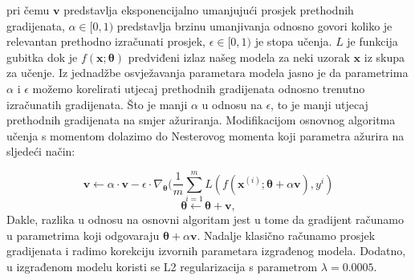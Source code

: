 \documentclass[times, utf8, diplomski]{fer}
\theoremstyle{definition}
\begin{document}
pri čemu $\bm{v}$ predstavlja eksponencijalno umanjujući prosjek prethodnih gradijenata, $\alpha \in [0, 1)$ predstavlja brzinu umanjivanja odnosno govori koliko je relevantan prethodno izračunati prosjek, $\epsilon \in [0, 1)$ je stopa učenja. $L$ je funkcija gubitka dok je $f(\bm{x}; \bm{\theta})$ predviđeni izlaz našeg modela za neki uzorak $\bm{x}$ iz skupa za učenje. Iz jednadžbe osvježavanja parametara modela jasno je da parametrima $\alpha$ i $\epsilon$ možemo korelirati utjecaj prethodnih gradijenata odnosno trenutno izračunatih gradijenata. Što je manji $\alpha$ u odnosu na $\epsilon$, to je manji utjecaj prethodnih gradijenata na smjer ažuriranja.
Modifikacijom osnovnog algoritma učenja s momentom dolazimo do Nesterovog momenta koji parametra ažurira na sljedeći način:

\begin{equation}
\bm{v} \leftarrow \alpha \cdot \bm{v} - \epsilon \cdot \nabla_{\bm{\theta}}(\frac{1}{m} \sum_{i=1}^{m}L(f(\bm{x}^{(i)}; \bm{\theta} + \alpha \bm{v}), y^i )
\end{equation}
\begin{equation}
\bm{\theta} \leftarrow \bm{\theta} + \bm{v},
\end{equation}
Dakle, razlika u odnosu na osnovni algoritam jest u tome da gradijent računamo u parametrima koji odgovaraju $\bm{\theta} + \alpha \bm{v}$. Nadalje klasično računamo prosjek gradijenata i radimo korekciju izvornih parametara izgrađenog modela. Dodatno, u izgrađenom modelu koristi se L2 regularizacija s parametrom $\lambda = 0.0005$.
\end{document}
